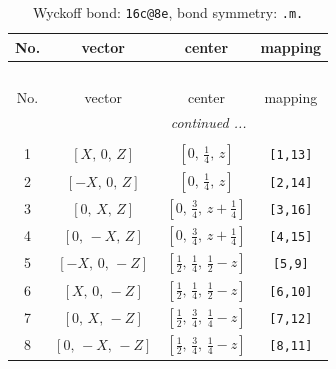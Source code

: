 \documentclass[fleqn,8pt]{jsarticle}
\begin{document}
\renewcommand{\arraystretch}{1.2}
\begin{longtable}{cccc}
\caption{Wyckoff bond: {\tt 16c@8e}, bond symmetry: {\tt .m.}}
 \\
 \hline \hline
No. & vector & center & mapping \\ \hline \endfirsthead

\multicolumn{3}{l}{\tablename\ \thetable{}} \\
 \hline \hline
No. & vector & center & mapping \\ \hline \endhead

 \hline \hline
\multicolumn{3}{r}{\footnotesize\it continued ...} \\ \endfoot

 \hline \hline
\multicolumn{3}{r}{} \\ \endlastfoot

1 & $\left[ X,\, 0,\, Z \right]$ & $\left[ 0,\, \frac{1}{4},\, z \right]$ & {\tt [1,13]} \\ \hline
2 & $\left[ - X,\, 0,\, Z \right]$ & $\left[ 0,\, \frac{1}{4},\, z \right]$ & {\tt [2,14]} \\ \hline
3 & $\left[ 0,\, X,\, Z \right]$ & $\left[ 0,\, \frac{3}{4},\, z + \frac{1}{4} \right]$ & {\tt [3,16]} \\ \hline
4 & $\left[ 0,\, - X,\, Z \right]$ & $\left[ 0,\, \frac{3}{4},\, z + \frac{1}{4} \right]$ & {\tt [4,15]} \\ \hline
5 & $\left[ - X,\, 0,\, - Z \right]$ & $\left[ \frac{1}{2},\, \frac{1}{4},\, \frac{1}{2} - z \right]$ & {\tt [5,9]} \\ \hline
6 & $\left[ X,\, 0,\, - Z \right]$ & $\left[ \frac{1}{2},\, \frac{1}{4},\, \frac{1}{2} - z \right]$ & {\tt [6,10]} \\ \hline
7 & $\left[ 0,\, X,\, - Z \right]$ & $\left[ \frac{1}{2},\, \frac{3}{4},\, \frac{1}{4} - z \right]$ & {\tt [7,12]} \\ \hline
8 & $\left[ 0,\, - X,\, - Z \right]$ & $\left[ \frac{1}{2},\, \frac{3}{4},\, \frac{1}{4} - z \right]$ & {\tt [8,11]} \\
\end{longtable}
\renewcommand{\arraystretch}{1.2}
\end{document}

